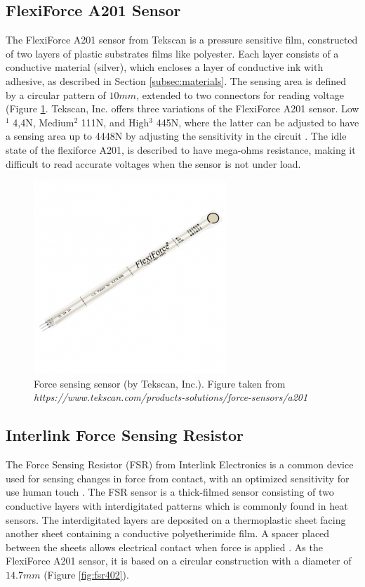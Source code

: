 \subsection{FlexiForce A201 Sensor}
\label{subsec:flexiforce}
The FlexiForce A201 sensor from Tekscan is a pressure sensitive film, constructed of two layers of plastic substrates films like polyester. Each layer consists of a conductive material (silver), which encloses a layer of conductive ink with adhesive, as described in Section \ref{subsec:materials}. The sensing area is defined by a circular pattern of $10mm$, extended to two connectors for reading voltage (Figure \ref{fig:tekscana201}. Tekscan, Inc. offers three variations of the FlexiForce A201 sensor. Low$^1$ 4,4\si{\newton}, Medium$^2$ 111\si{\newton}, and High$^3$ 445\si{\newton}, where the latter can be adjusted to have a sensing area up to 4448\si{\newton} by adjusting the sensitivity in the circuit \citep{tekscanA201}. The idle state of the flexiforce A201, is described to have mega-ohms resistance, making it difficult to read accurate voltages when the sensor is not under load.
\begin{figure}
    \centering
    \includegraphics[scale=0.85]{figures/A201.jpg}
    \caption{Force sensing sensor (by Tekscan, Inc.). Figure taken from \textit{https://www.tekscan.com/products-solutions/force-sensors/a201}}
    \label{fig:tekscana201}
\end{figure}

\subsection{Interlink Force Sensing Resistor}
\label{subsec:interlink}
The Force Sensing Resistor (FSR) from Interlink Electronics is a common device used for sensing changes in force from contact, with an optimized sensitivity for use human touch \citep{interlinkelectronics}. The FSR sensor is a thick-filmed sensor consisting of two conductive layers with interdigitated patterns which is commonly found in heat sensors. The interdigitated layers are deposited on a thermoplastic sheet facing another sheet containing a conductive polyetherimide film. A spacer placed between the sheets allows electrical contact when force is applied \citep{vecchi_experimental_2000}. As the FlexiForce A201 sensor, it is based on a circular construction with a diameter of $14.7 mm$ (Figure \ref{fig:fsr402}). 

